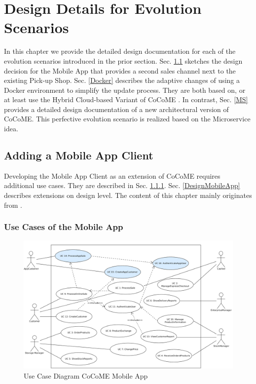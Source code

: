 \chapter{Design Details for Evolution Scenarios}
In this chapter we provide the detailed design documentation for each of the evolution scenarios
introduced in the prior section. Sec. \ref{App} sketches the design decision for the Mobile App that provides a second sales channel next to the existing Pick-up Shop. Sec. \ref{Docker} describes the adaptive changes of using a Docker environment to simplify the update process. They are both based on, or at least use the Hybrid Cloud-based Variant of CoCoME \cite{HeinrichRostamiReussner2016_1000052688}. In contrast, Sec. \ref{MS} provides a detailed design documentation of a new architectural version of CoCoME. This perfective evolution scenario is realized based on the Microservice idea.

\section{Adding a Mobile App Client} \label{App}
Developing the Mobile App Client as an extension of CoCoME requires additional use cases. They are described in Sec. \ref{UseCasesMobileApp}. Sec. \ref{DesignMobileApp} describes extensions on design level. The content of this chapter mainly originates from \cite{schnabel}.
\subsection{Use Cases of the Mobile App}\label{UseCasesMobileApp}
		\begin{figure}[t]
			\includegraphics[width=\textwidth]{img/appUseCase.png}
			\caption{Use Case Diagram CoCoME Mobile App}
		\end{figure}

